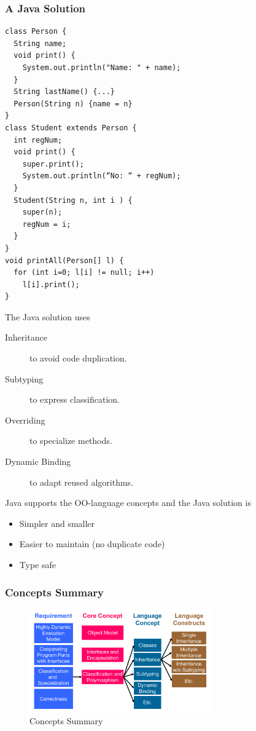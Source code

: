 \subsubsection{A Java Solution}
\lstset{language=Java}
\begin{lstlisting}
class Person {
  String name;
  void print() {
    System.out.println("Name: " + name);
  }
  String lastName() {...}
  Person(String n) {name = n}
}
class Student extends Person {
  int regNum;
  void print() {
    super.print();
    System.out.println(“No: “ + regNum);
  }
  Student(String n, int i ) {
    super(n);
    regNum = i;
  }
}
void printAll(Person[] l) {
  for (int i=0; l[i] != null; i++)
    l[i].print();
}
\end{lstlisting}

The Java solution uses
\begin{description}
 \item[Inheritance] to avoid code duplication.
 \item[Subtyping] to express classification.
 \item[Overriding] to specialize methods.
 \item[Dynamic Binding] to adapt reused algorithms.
\end{description}
Java supports the OO-language concepts and the Java solution is
\begin{itemize}
 \item Simpler and smaller
 \item Easier to maintain (no duplicate code)
 \item Type safe
\end{itemize}

\subsubsection{Concepts Summary}
\begin{figure}[H]
  \centering
    \includegraphics[width=0.7\textwidth]{img/01_concepts_summary}
      \caption{Concepts Summary}
\end{figure}